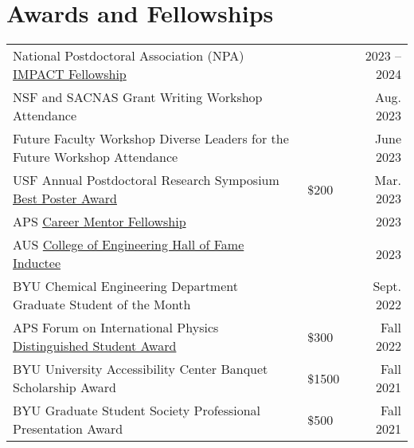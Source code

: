 \documentclass[letterpaper,11pt]{article}
\begin{document}
%
\section*{Awards and Fellowships}
\begin{tabular}{@{}p{} p{} r@{}}
  National Postdoctoral Association (NPA) \href{https://www.nationalpostdoc.org/general/custom.asp?page=IMPACTProgram}{IMPACT Fellowship} 	& & 2023 -- 2024\\[3.5pt]
  NSF and SACNAS Grant Writing Workshop Attendance                           									& & Aug. 2023 \\[3.5pt]
  Future Faculty Workshop Diverse Leaders for the Future Workshop Attendance 									& & June 2023 \\[3.5pt]
  USF Annual Postdoctoral Research Symposium \href{https://www.usf.edu/postdoctoral-affairs/postdoc-services/postdoc-spotlight.aspx#:~:text=BEST\%20POSTERS\%3A-,Pierre\%20Kawak,-Exploring\%20Mechanisms\%20of}{Best Poster Award}               & \$200 & Mar. 2023 \\[3.5pt]
  APS \href{https://www.aps.org/careers/guidance/mentoring.cfm}{Career Mentor Fellowship}                                               	& & 2023 \\[3.5pt]
  AUS \href{https://www.aus.edu/cen/alumni-hall-of-fame#:~:text=of\%20Technology\%20Sydney-,Dr.\%20Pierre\%20Kawak\%C2\%A0,-BS\%27\%2015\%20\%2D\%20Chemical}{College of Engineering Hall of Fame Inductee}                           & & 2023 \\[3.5pt]
  BYU Chemical Engineering Department Graduate Student of the Month          									& & Sept. 2022 \\[3.5pt]
  APS Forum on International Physics \href{https://engage.aps.org/fip/honors/prizes-awards/ds-program}{Distinguished Student Award}             & \$300 & Fall 2022 \\[3.5pt] %
  BYU University Accessibility Center Banquet Scholarship Award              									& \$1500 & Fall 2021 \\[3.5pt] %
  BYU Graduate Student Society Professional Presentation Award               									& \$500 & Fall 2021 \\[3.5pt] %

\end{tabular}
\end{document}
